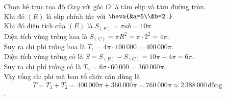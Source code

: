 \begin{bt}
{\begin{center}
\begin{tikzpicture}[scale=0.8, font=\footnotesize, line join=round, line cap=round, >=stealth]
\end{tikzpicture}
\end{center}
Chọn hệ trục tọa độ $Oxy$ với gốc $O$ là tâm elip và tâm đường tròn. \\
Khi đó $(E)$ là elip chính tắc với $\heva{&a=5\\&b=2.}$ \\
Khi đó diện tích của $(E)$ là $S_{(E)}=\pi ab=10\pi$. \\
Diện tích vùng trồng hoa là $S_{(C)}=\pi R^2=\pi\cdot2^2=4\pi$. \\
Suy ra chi phí trồng hoa là $T_1=4\pi\cdot100\,000=400\,000\pi$. \\
Diện tích vùng trồng cỏ là $S=S_{(E)}-S_{(C)}=10\pi-4\pi=6\pi$. \\
Suy ra chi phí trồng cỏ là $T_2=6\pi\cdot60\,000=360\,000\pi$. \\
Vậy tổng chi phí mà ban tổ chức cần dùng là
\[T=T_1+T_2=400\,000\pi+360\,000\pi=760\,000\pi\approx2\,388\,000\,\text{đồng}\]. \\
}
\end{bt}

